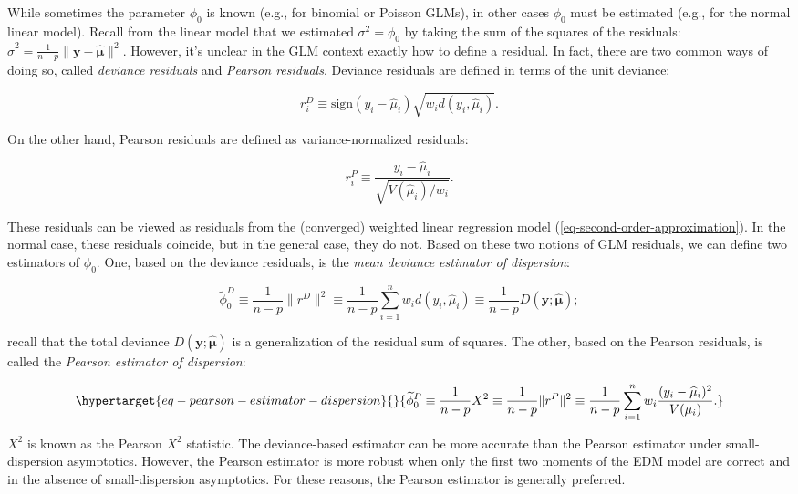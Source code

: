 \documentclass[
  11pt,
  letterpaper,
  oneside]{book}
\theoremstyle{definition}
\theoremstyle{plain}
\theoremstyle{plain}
\theoremstyle{plain}
\theoremstyle{remark}
\begin{document}
While sometimes the parameter \(\phi_0\) is known (e.g., for binomial or
Poisson GLMs), in other cases \(\phi_0\) must be estimated (e.g., for
the normal linear model). Recall from the linear model that we estimated
\(\sigma^2 = \phi_0\) by taking the sum of the squares of the residuals:
\(\widehat \sigma^2 = \frac{1}{n-p}\|\boldsymbol{y} - \boldsymbol{\widehat \mu}\|^2\).
However, it's unclear in the GLM context exactly how to define a
residual. In fact, there are two common ways of doing so, called
\emph{deviance residuals} and \emph{Pearson residuals}. Deviance
residuals are defined in terms of the unit deviance:

\[
  r^D_i \equiv \text{sign}(y_i - \widehat \mu_i)\sqrt{w_i d(y_i, \widehat \mu_i)}.
\]

On the other hand, Pearson residuals are defined as variance-normalized
residuals:

\[
  r^P_i \equiv \frac{y_i - \widehat \mu_i}{\sqrt{V(\widehat \mu_i)/w_i}}.
\]

These residuals can be viewed as residuals from the (converged) weighted
linear regression model (\ref{eq-second-order-approximation}). In the
normal case, these residuals coincide, but in the general case, they do
not. Based on these two notions of GLM residuals, we can define two
estimators of \(\phi_0\). One, based on the deviance residuals, is the
\emph{mean deviance estimator of dispersion}:

\[
\widetilde \phi^D_0 \equiv \frac{1}{n-p}\|r^D\|^2 \equiv \frac{1}{n-p}\sum_{i = 1}^n w_i d(y_i, \widehat \mu_i) \equiv \frac{1}{n-p}D(\boldsymbol{y}; \boldsymbol{\widehat \mu});
\]

recall that the total deviance
\(D(\boldsymbol{y}; \boldsymbol{\widehat \mu})\) is a generalization of
the residual sum of squares. The other, based on the Pearson residuals,
is called the \emph{Pearson estimator of dispersion}:

\begin{equation}\protect\hypertarget{eq-pearson-estimator-dispersion}{}{
\widetilde \phi^P_0 \equiv \frac{1}{n-p}X^2 \equiv \frac{1}{n-p}\|r^P\|^2 \equiv \frac{1}{n-p}\sum_{i = 1}^n w_i \frac{(y_i - \widehat \mu_i)^2}{V(\mu_i)}.
}\label{eq-pearson-estimator-dispersion}\end{equation}

\(X^2\) is known as the Pearson \(X^2\) statistic. The deviance-based
estimator can be more accurate than the Pearson estimator under
small-dispersion asymptotics. However, the Pearson estimator is more
robust when only the first two moments of the EDM model are correct and
in the absence of small-dispersion asymptotics. For these reasons, the
Pearson estimator is generally preferred.
\end{document}
